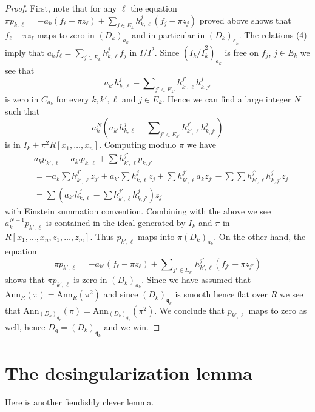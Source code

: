 \begin{proof}
\medskip\noindent
First, note that for any $\ell$ the equation
$\pi p_{k, \ell} = -a_k(f_\ell - \pi z_\ell) +
\sum_{j \in E_k} h_{k, \ell}^j (f_j - \pi z_j)$ proved above shows that
$f_\ell - \pi z_\ell$ maps to zero in $(D_k)_{a_k}$ and in particular
in $(D_k)_{\mathfrak q_k}$.
The relations (4) imply that $a_k f_\ell =
\sum_{j \in E_k} h_{k, \ell}^j f_j$ in $I/I^2$.
Since $(\bar I_k/\bar I_k^2)_{a_k}$ is free on $f_j$, $j \in E_k$
we see that
$$
a_{k'} h_{k, \ell}^j -
\sum\nolimits_{j' \in E_{k'}} h_{k', \ell}^{j'} h_{k, j'}^j
$$
is zero in $\bar C_{a_k}$ for every $k, k', \ell$ and $j \in E_k$.
Hence we can find a large integer $N$ such that
$$
a_k^N\left(
a_{k'} h_{k, \ell}^j -
\sum\nolimits_{j' \in E_{k'}} h_{k', \ell}^{j'} h_{k, j'}^j
\right)
$$
is in $I_k + \pi^2R[x_1, \ldots, x_n]$. Computing modulo $\pi$ we have
\begin{align*}
&
a_kp_{k', \ell} - a_{k'}p_{k, \ell} + \sum h_{k', \ell}^{j'} p_{k, j'}
\\
&
=
- a_k \sum h_{k', \ell}^{j'} z_{j'}
+ a_{k'} \sum h_{k, \ell}^j z_j
+ \sum h_{k', \ell}^{j'} a_k z_{j'}
- \sum \sum h_{k', \ell}^{j'} h_{k, j'}^j z_j \\
&
=
\sum \left(
a_{k'} h_{k, \ell}^j
- \sum h_{k', \ell}^{j'} h_{k, j'}^j
\right) z_j
\end{align*}
with Einstein summation convention. Combining with the above we see
$a_k^{N + 1} p_{k', \ell}$ is contained in the ideal generated
by $I_k$ and $\pi$ in $R[x_1, \ldots, x_n, z_1, \ldots, z_m]$.
Thus $p_{k', \ell}$ maps into $\pi (D_k)_{a_k}$. On the other hand,
the equation
$$
\pi p_{k', \ell} =
-a_{k'} (f_\ell - \pi z_\ell) +
\sum\nolimits_{j' \in E_{k'}} h_{k', \ell}^{j'}(f_{j'} - \pi z_{j'})
$$
shows that $\pi p_{k', \ell}$ is zero in $(D_k)_{a_k}$.
Since we have assumed that $\text{Ann}_R(\pi) = \text{Ann}_R(\pi^2)$
and since $(D_k)_{\mathfrak q_k}$ is smooth hence flat over $R$
we see that
$\text{Ann}_{(D_k)_{\mathfrak q_k}}(\pi) =
\text{Ann}_{(D_k)_{\mathfrak q_k}}(\pi^2)$.
We conclude that $p_{k', \ell}$ maps to zero as well, hence
$D_{\mathfrak q} = (D_k)_{\mathfrak q_k}$ and we win.
\end{proof}

\section{The desingularization lemma}
\label{smoothing-section-desingularization-lemma}
Here is another fiendishly clever lemma.

